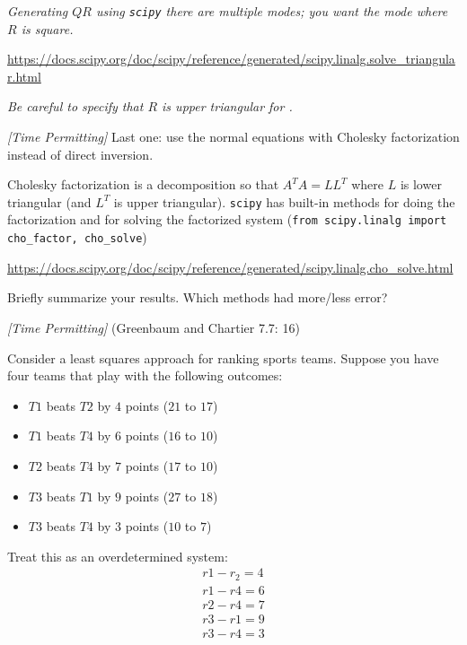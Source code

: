 \documentclass[12pt,letterpaper,noanswers]{exam}
\begin{document}
\begin{questions}
\begin{parts}
\begin{subparts}
\emph{Generating $QR$ using \texttt{scipy} there are multiple modes; you want the mode where $R$ is square.}

\url{https://docs.scipy.org/doc/scipy/reference/generated/scipy.linalg.solve_triangular.html}

\emph{Be careful to specify that $R$ is upper triangular for .}

\item \emph{[Time Permitting]} Last one: use the normal equations with Cholesky factorization instead of direct inversion.

Cholesky factorization is a decomposition so that $A^TA = LL^T$ where $L$ is lower triangular (and $L^T$ is upper triangular).  \texttt{scipy} has built-in methods for doing the factorization and for solving the factorized system (\texttt{from scipy.linalg import cho\_factor, cho\_solve})




\url{https://docs.scipy.org/doc/scipy/reference/generated/scipy.linalg.cho_solve.html}


\end{subparts}

Briefly summarize your results.  Which methods had more/less error?


\end{parts}

\question \emph{[Time Permitting]} (Greenbaum and Chartier 7.7: 16)


Consider a least squares approach for ranking sports teams.  Suppose you have four teams that play with the following outcomes:
\begin{itemize}
\itemsep0pt
    \item $T1$ beats $T2$ by $4$ points ($21$ to $17$)
    \item $T1$ beats $T4$ by $6$ points ($16$ to $10$)
    \item $T2$ beats $T4$ by $7$ points ($17$ to $10$)
    \item $T3$ beats $T1$ by $9$ points ($27$ to $18$)
    \item $T3$ beats $T4$ by $3$ points ($10$ to $7$)
\end{itemize}

Treat this as an overdetermined system:
\[\begin{array}{c}
r1-r_2=4 \\
r1    -r4  = 6 \\
 r2   -r4 =7\\
r3-r1=9\\
  r3 -r4 =3
\end{array}
\]


\end{questions}
\end{document}
